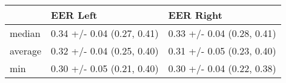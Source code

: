 \begin{tabular}{lll}
\toprule
{} &                    EER Left &                   EER Right \\
\midrule
median  &  0.34 +/- 0.04 (0.27, 0.41) &  0.33 +/- 0.04 (0.28, 0.41) \\
average &  0.32 +/- 0.04 (0.25, 0.40) &  0.31 +/- 0.05 (0.23, 0.40) \\
min     &  0.30 +/- 0.05 (0.21, 0.40) &  0.30 +/- 0.04 (0.22, 0.38) \\
\bottomrule
\end{tabular}
